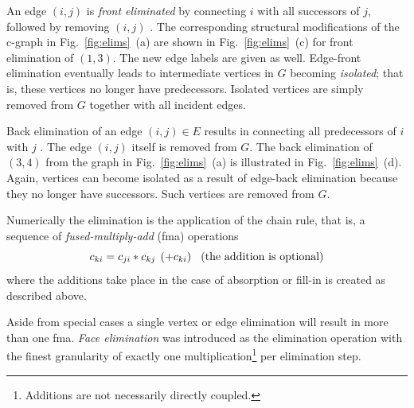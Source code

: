 \documentclass[11pt]{article}
\newcommand{\reffig}[1]{{Fig.~\ref{#1}}}
\begin{document}
An edge $(i,j)$ is {\em front eliminated} by connecting $i$ with all successors
of $j$, followed by removing $(i,j)$ \cite{Nau00a}.
The corresponding structural modifications of the c-graph in
\reffig{fig:elims}~(a) are shown in
\reffig{fig:elims}~(c) for front elimination of $(1,3).$
The new edge labels are given as well.
Edge-front elimination eventually leads to intermediate vertices in $G$
becoming
{\em isolated}; that is, these vertices no longer have predecessors.
Isolated vertices are simply removed from $G$ together
with all incident edges.

Back elimination of an edge
$(i,j) \in E$ results in connecting all predecessors of $i$
with $j$ \cite{Nau00a}.
The edge $(i,j)$ itself is removed from $G.$
The back elimination of $(3,4)$ from the graph in \reffig{fig:elims}~(a) 
is illustrated in \reffig{fig:elims}~(d). 
Again, vertices can become isolated as a result of edge-back elimination
because they no longer have successors.
Such vertices are removed from $G.$

Numerically the elimination is the application of 
the chain rule, that is, a sequence of {\em fused-multiply-add} (fma) operations
\begin{equation}\label{eqn:fma}
c_{ki}=c_{ji}*c_{kj}\hspace*{1ex}(+c_{ki}) \hspace*{2ex}\mbox{(the addition is optional)}
\end{equation}
where the additions take place in the case of absorption or fill-in is created 
as described above.

Aside from special cases a single vertex or edge elimination will result in more
than one fma. {\em Face elimination} was introduced 
as the elimination operation with the finest granularity of exactly 
one multiplication\footnote{Additions are not necessarily directly coupled.} 
per elimination step.
\end{document}
